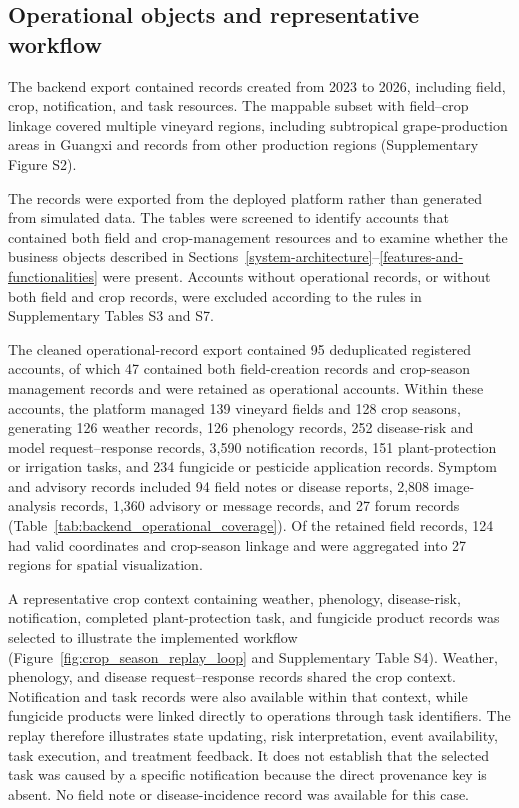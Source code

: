 \documentclass[12pt]{article}
\begin{document}
\subsection{Operational objects and representative workflow}\label{operational-objects-and-representative-workflow}

The backend export contained records created from 2023 to 2026, including field, crop, notification, and task resources. The mappable subset with field--crop linkage covered multiple vineyard regions, including subtropical grape-production areas in Guangxi and records from other production regions (Supplementary Figure S2).

The records were exported from the deployed platform rather than generated from simulated data. The tables were screened to identify accounts that contained both field and crop-management resources and to examine whether the business objects described in Sections~\ref{system-architecture}--\ref{features-and-functionalities} were present. Accounts without operational records, or without both field and crop records, were excluded according to the rules in Supplementary Tables S3 and S7.

The cleaned operational-record export contained 95 deduplicated registered accounts, of which 47 contained both field-creation records and crop-season management records and were retained as operational accounts. Within these accounts, the platform managed 139 vineyard fields and 128 crop seasons, generating 126 weather records, 126 phenology records, 252 disease-risk and model request--response records, 3,590 notification records, 151 plant-protection or irrigation tasks, and 234 fungicide or pesticide application records. Symptom and advisory records included 94 field notes or disease reports, 2,808 image-analysis records, 1,360 advisory or message records, and 27 forum records (Table~\ref{tab:backend_operational_coverage}). Of the retained field records, 124 had valid coordinates and crop-season linkage and were aggregated into 27 regions for spatial visualization.

A representative crop context containing weather, phenology, disease-risk, notification, completed plant-protection task, and fungicide product records was selected to illustrate the implemented workflow (Figure~\ref{fig:crop_season_replay_loop} and Supplementary Table S4). Weather, phenology, and disease request--response records shared the crop context. Notification and task records were also available within that context, while fungicide products were linked directly to operations through task identifiers. The replay therefore illustrates state updating, risk interpretation, event availability, task execution, and treatment feedback. It does not establish that the selected task was caused by a specific notification because the direct provenance key is absent. No field note or disease-incidence record was available for this case.
\end{document}
